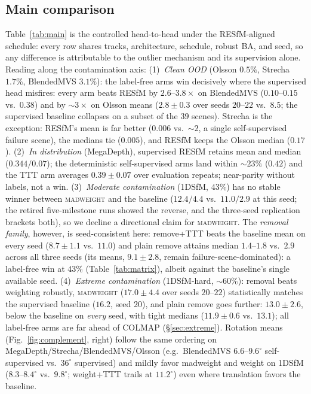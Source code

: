 \documentclass[10pt,twocolumn,letterpaper]{article}
\newcommand{\mad}{\textsc{madweight}}
\renewcommand{\deg}{^{\circ}}             %
\begin{document}
\subsection{Main comparison}
Table~\ref{tab:main} is the controlled head-to-head under the RESfM-aligned schedule:
every row shares tracks, architecture, schedule, robust BA, and seed, so any difference is
attributable to the outlier mechanism and its supervision alone. Reading along the
contamination axis:
(1)~\emph{Clean OOD} (Olsson $0.5\%$, Strecha $1.7\%$, BlendedMVS $3.1\%$): the
label-free arms win decisively where the supervised head misfires: every arm beats RESfM
by $2.6$--$3.8\times$ on BlendedMVS ($0.10$--$0.15$ vs.\ $0.38$) and by ${\sim}3\times$ on
Olsson means ($2.8\pm0.3$ over seeds $20$--$22$ vs.\ $8.5$; the supervised baseline
collapses on a subset of the $39$ scenes). Strecha is the exception: RESfM's mean is far better ($0.006$ vs.\ $\sim\!2$, a
single self-supervised failure scene), the medians tie ($0.005$), and RESfM keeps the
Olsson median ($0.17$).
(2)~\emph{In distribution} (MegaDepth), supervised RESfM retains mean and median
($0.344/0.07$); the deterministic self-supervised arms land within $\sim\!23\%$ ($0.42$)
and the TTT arm averages $0.39\pm0.07$ over evaluation repeats; near-parity without
labels, not a win.
(3)~\emph{Moderate contamination} (1DSfM, $43\%$) has no stable winner between \mad{}
and the baseline ($12.4/4.4$ vs.\ $11.0/2.9$ at this seed; the retired five-milestone
runs showed the reverse, and the three-seed replication brackets both), so we decline a
directional claim for \mad{}. The \emph{removal family}, however, is seed-consistent
here: remove+TTT beats the baseline mean on every seed ($8.7\pm1.1$ vs.\ $11.0$) and
plain remove attains median $1.4$--$1.8$ vs.\ $2.9$ across all three seeds (its means,
$9.1\pm2.8$, remain failure-scene-dominated): a label-free win at $43\%$
(Table~\ref{tab:matrix}), albeit against the baseline's single available seed.
(4)~\emph{Extreme contamination} (1DSfM-hard, ${\sim}60\%$): removal beats weighting
robustly, \mad{} ($17.0\pm4.4$ over seeds $20$--$22$) statistically matches the
supervised baseline ($16.2$, seed 20), and plain remove goes further: $13.0\pm2.6$,
below the baseline on \emph{every} seed, with tight medians ($11.9\pm0.6$ vs.\
$13.1$); all label-free arms are far ahead of COLMAP (\S\ref{sec:extreme}). Rotation means (Fig.~\ref{fig:complement}, right) follow the same ordering on
MegaDepth/Strecha/BlendedMVS/Olsson (e.g.\ BlendedMVS $6.6$--$9.6\deg$ self-supervised
vs.\ $36\deg$ supervised) and mildly favor madweight and weight on 1DSfM
($8.3$--$8.4\deg$ vs.\ $9.8\deg$; weight+TTT trails at $11.2\deg$) even where translation
favors the baseline. 
\end{document}
